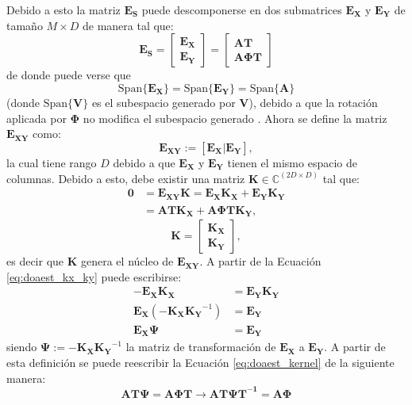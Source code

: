 Debido a esto la matriz $\mathbf{E_S}$ puede descomponerse en dos submatrices $\mathbf{E_X}$ y $\mathbf{E_Y}$ de tamaño $M\times D$ de manera tal que:
\begin{equation}
    \mathbf{E_S}=\begin{bmatrix}
        \mathbf{E_X} \\
        \mathbf{E_Y}
    \end{bmatrix}=
    \begin{bmatrix}
        \mathbf{AT} \\
        \mathbf{A\Phi T}
    \end{bmatrix}
    \label{eq:doaest_esprit_ex_ey}
\end{equation}
de donde puede verse que
\begin{equation}
    \textrm{Span}\{\mathbf{E_X}\}=\textrm{Span}\{\mathbf{E_Y}\}=\textrm{Span}\{\mathbf{A}\}
\end{equation}
(donde $\textrm{Span}\{\mathbf{V}\}$ es el subespacio generado por $\mathbf{V}$), debido a que la rotación aplicada por $\mathbf{\Phi}$ no modifica el subespacio generado \cite{bib:esprit_roy}.
Ahora se define la matriz $\mathbf{E_{XY}}$ como:
\begin{equation}
    \mathbf{E_{XY}}:= [\mathbf{E_{X}} | \mathbf{E_{Y}}],
    \label{eq:doaest_e_xy}
\end{equation}
la cual tiene rango $D$ debido a que $\mathbf{E_{X}}$ y $\mathbf{E_{Y}}$ tienen el mismo espacio de columnas. Debido a esto, debe existir una matriz $\mathbf{K} \in \mathbb{C}^{(2D\times D)}$ tal que:
\begin{align}
    \mathbf{0} & = \mathbf{E_{XY}K} = \mathbf{E_X K_X} + \mathbf{E_Y K_Y} \label{eq:doaest_kx_ky} \\
               & = \mathbf{ATK_X+A\Phi T K_Y},
    \label{eq:doaest_kernel}
\end{align}
\begin{equation*}
    \mathbf{K}=\begin{bmatrix}
        \mathbf{K_X} \\
        \mathbf{K_Y}
    \end{bmatrix},
\end{equation*}
es decir que $\mathbf{K}$ genera el núcleo de $\mathbf{E_{XY}}$. A partir de la Ecuación \ref{eq:doaest_kx_ky} puede escribirse:
\begin{align}
    -\mathbf{E_X K_X}                                  & =\mathbf{E_Y K_Y}\nonumber \\
    \mathbf{E_X} \left( \mathbf{-K_X K_Y}^{-1} \right) & =\mathbf{E_Y}\nonumber     \\
    \mathbf{E_X \Psi}                                  & =\mathbf{E_Y}
    \label{eq:doaest_psi}
\end{align}
siendo $\mathbf{\Psi}:=-\mathbf{K_X K_Y}^{-1}$ la matriz de transformación de $\mathbf{E_X}$ a $\mathbf{E_Y}$. A partir de esta definición se puede reescribir la Ecuación \ref{eq:doaest_kernel} de la siguiente manera:
\begin{equation}
    \mathbf{AT\Psi} = \mathbf{A\Phi T \rightarrow \mathbf{AT\Psi T}^{-1} = \mathbf{A\Phi}}
\end{equation}

